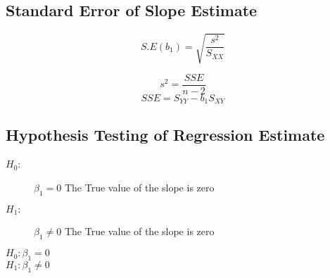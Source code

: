 \documentclass[]{report}
\begin{document}
\subsection{Standard Error of Slope Estimate}
\[S.E(b_1) = \sqrt{\frac{s^2}{S_{XX}}} \]

\[s^2 = \frac{SSE}{n-2} \]
\[SSE = S_{YY}- b_1S_{XY}\]



\subsection{Hypothesis Testing of Regression Estimate}

\begin{description}
	\item[$H_0$:] $\beta_1 = 0$  The True value of the slope is zero
	\item[$H_1:$] $\beta_1 \neq 0$ The True value of the slope is zero
\end{description}


$H_0: \beta_1 = 0$\\
$H_1: \beta_1 \neq 0$\\


	
\end{document}
